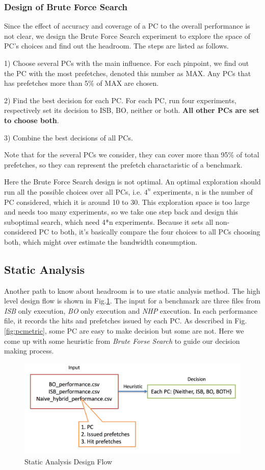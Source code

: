     \subsubsection{Design of Brute Force Search}
    \label{sec:designBFS}
    Since the effect of accuracy and coverage of a PC to the overall performance is not clear, we design the Brute Force Search experiment to explore the space of PC's choices and find out the headroom. The steps are listed as follows. \par
    1) Choose several PCs with the main influence. For each pinpoint, we find out the PC with the most prefetches, denoted this number as MAX. Any PCs that has prefetches more than 5\% of MAX are chosen.\par
    2) Find the best decision for each PC. For each PC, run four experiments, respectively set its decision to ISB, BO, neither or both. \textbf{All other PCs are set to choose both}.\par
    3) Combine the best decisions of all PCs.\par
    Note that for the several PCs we consider, they can cover more than 95\% of total prefetches, so they can represent the prefetch charactaristic of a benchmark. \par
    Here the Brute Force Search design is not optimal. An optimal exploration should run all the possible choices over all PCs, i.e. $4^{n}$ experiments, n is the number of PC considered, which it is around 10 to 30.
    This exploration space is too large and needs too many experiments, so we take one step back and design this suboptimal search, which need 4*n experiments. Because it sets all non-considered PC to both, it's basically compare the four choices to all PCs choosing both, which might over estimate the bandwidth consumption. \par

  \subsection{Static Analysis}
  \label{sec:staticanalysis}
  Another path to know about headroom is to use static analysis method. The high level design flow is shown in Fig.\ref{fig:staticanalysis_flow}. The input for a benchmark are three files from \emph{ISB} only execution, \emph{BO} only execution and \emph{NHP} execution. In each performance file, it records the hits and prefetches issued by each PC. As described in Fig.\ref{fig:pcmetric}, some PC are easy to make decision but some are not. Here we come up with some heuristic from \emph{Brute Forse Search} to guide our decision making process. 

  \begin{figure}[ht!]
	\centering
	\includegraphics[width=1.0\textwidth]{images/staticanalysis_flow.png}
	\caption{Static Analysis Design Flow}
	\label{fig:staticanalysis_flow}
  \end{figure}
